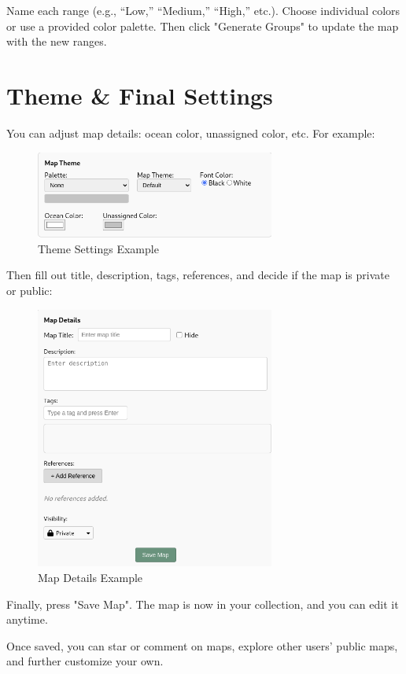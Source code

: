 \documentclass{article}
\begin{document}
Name each range (e.g., “Low,” “Medium,” “High,” etc.). Choose individual colors or 
use a provided color palette. Then click "Generate Groups" to 
update the map with the new ranges.

\section{Theme \& Final Settings}

You can adjust map details: ocean color, unassigned color, etc. 
For example:

\begin{figure}[h!]
  \centering
  \includegraphics[width=0.7\textwidth]{map_theme.png}
  \caption{Theme Settings Example}
\end{figure}

Then fill out title, description, tags, 
references, and decide if the map is private or public:

\begin{figure}[h!]
  \centering
  \includegraphics[width=0.7\textwidth]{map_details.png}
  \caption{Map Details Example}
\end{figure}

Finally, press "Save Map". The map is now in your collection, and you can 
edit it anytime.

Once saved, you can star or comment on maps, explore other 
users’ public maps, and further customize your own.
\end{document}
